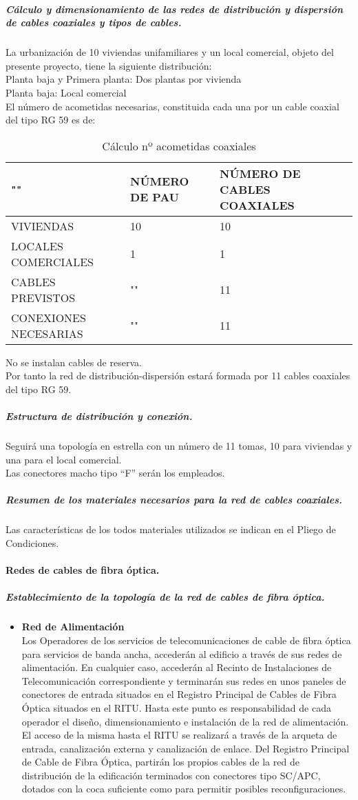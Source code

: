 \subparagraph{Cálculo y dimensionamiento de las redes de distribución y dispersión de cables coaxiales y tipos de cables.}
La urbanización de 10 viviendas unifamiliares y un local comercial, objeto del presente proyecto, tiene la siguiente distribución:\\
Planta baja y Primera planta:			Dos plantas por vivienda\\
Planta baja:							Local comercial\\
El número de acometidas necesarias, constituida cada una por un cable coaxial del tipo RG 59 es de:
\begin{table}[H]
\centering
\begin{tabular}{p{5cm} p{5cm} p{5cm}}
\hline
""&NÚMERO DE PAU&NÚMERO DE CABLES COAXIALES \\
\hline \hline
VIVIENDAS&10&10\\
\hline
LOCALES COMERCIALES&1&1\\
\hline
CABLES PREVISTOS&""&11\\
\hline
CONEXIONES NECESARIAS&""&11\\
\end{tabular}
\caption{Cálculo nº acometidas coaxiales}
\label{tabla:autores}
\end{table}
No se instalan cables de reserva.\\
Por tanto la red de distribución-dispersión estará formada por 11 cables coaxiales del tipo RG 59.
\subparagraph{Estructura de distribución y conexión.}
Seguirá una topología en estrella con un número de 11 tomas, 10 para viviendas y una para el local comercial.\\
Las conectores macho tipo “F” serán los empleados.
\subparagraph{Resumen de los materiales necesarios para la red de cables coaxiales.}
Las características de los todos materiales utilizados se indican en el Pliego de Condiciones.
\paragraph{Redes de cables de fibra óptica.}
\subparagraph{Establecimiento de la topología de la red de cables de fibra óptica.}
\begin{itemize}
	\item \textbf{Red de Alimentación}\\
	Los Operadores de los servicios de telecomunicaciones de cable de fibra óptica para servicios de
banda ancha, accederán al edificio a través de sus redes de alimentación. En cualquier caso,
accederán al Recinto de Instalaciones de Telecomunicación correspondiente y terminarán sus
redes en unos paneles de conectores de entrada situados en el Registro Principal de Cables de
Fibra Óptica situados en el RITU.
Hasta este punto es responsabilidad de cada operador el diseño, dimensionamiento e instalación
de la red de alimentación. El acceso de la misma hasta el RITU se realizará a través de la arqueta
de entrada, canalización externa y canalización de enlace.
Del Registro Principal de Cable de Fibra Óptica, partirán los propios cables de la red de
distribución de la edificación terminados con conectores tipo SC/APC, dotados con la coca
suficiente como para permitir posibles reconfiguraciones.
\end{itemize}

